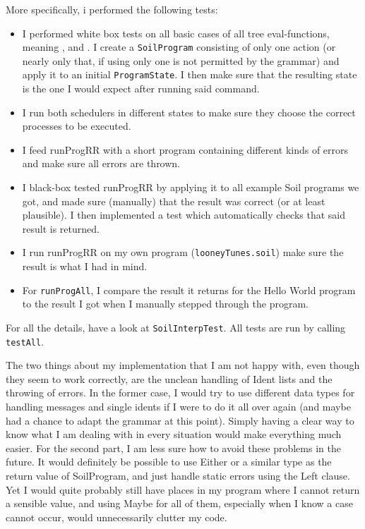 \documentclass[a4paper]{article}
\begin{document}
More specifically, i performed the following tests: 
\begin{itemize}
  \item I performed white box tests on all basic cases of all tree eval-functions, meaning ,  and . I create a \texttt{SoilProgram} consisting of only one action (or nearly only that, if using only one is not permitted by the grammar) and apply it to an initial \texttt{ProgramState}. I then make sure that the resulting state is the one I would expect after running said command.
  \item I run both schedulers in different states to make sure they choose the correct processes to be executed.
  \item I feed runProgRR with a short program containing different kinds of errors and make sure all errors are thrown.
  \item I black-box tested runProgRR by applying it to all example Soil programs we got, and made sure (manually) that the result was correct (or at least plausible). I then implemented a test which automatically checks that said result is returned. 
  \item I run runProgRR on my own program (\texttt{looneyTunes.soil}) make sure the result is what I had in mind.
  \item For \texttt{runProgAll}, I compare the result it returns for the Hello World program to the result I got when I manually stepped through the program.
\end{itemize}
For all the details, have a look at \texttt{SoilInterpTest}. All tests are run by calling \texttt{testAll}.

The two things about my implementation that I am not happy with, even though they seem to work correctly, are the unclean handling of Ident lists and the throwing of errors. In the former case, I would try to use different data types for handling messages and single idents if I were to do it all over again (and maybe had a chance to adapt the grammar at this point). Simply having a clear way to know what I am dealing with in every situation would make everything much easier. For the second part, I am less sure how to avoid these problems in the future. It would definitely be possible to use Either or a similar type as the return value of SoilProgram, and just handle static errors using the Left clause. Yet I would quite probably still have places in my program where I cannot return a sensible value, and using Maybe for all of them, especially when I know a case cannot occur, would unnecessarily clutter my code.
\end{document}
